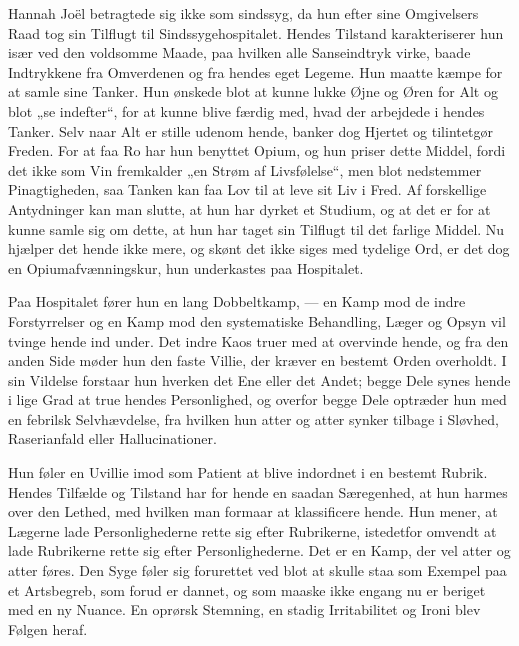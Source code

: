 \documentclass[12pt,a4paper,openany]{book}
\newcommand{\opage}[1]{\marginnote{\footnotesize\textit{[#1]}}}
\begin{document}
Hannah Joël betragtede sig ikke som sindssyg, da hun
efter sine Omgivelsers Raad tog sin Tilflugt til Sindssygehospitalet.
Hendes Tilstand karakteriserer hun især ved den voldsomme
Maade, paa hvilken alle Sanseindtryk virke, baade Indtrykkene
fra Omverdenen og fra hendes eget Legeme. Hun
maatte kæmpe for at samle sine Tanker. Hun ønskede blot at
kunne lukke Øjne og Øren for Alt og blot „se indefter“, for
at kunne blive færdig med, hvad der arbejdede i hendes Tanker.
Selv naar Alt er stille udenom hende, banker dog Hjertet og
tilintetgør Freden. For at faa Ro har hun benyttet Opium, og
hun priser dette Middel, fordi det ikke som Vin fremkalder „en
Strøm af Livsfølelse“, men blot nedstemmer Pinagtigheden, saa
Tanken kan faa Lov til at leve sit Liv i Fred. Af forskellige
Antydninger kan man slutte, at hun har dyrket et Studium, og
at det er for at kunne samle sig om dette, at hun har taget
sin Tilflugt til det farlige Middel. Nu hjælper det hende ikke
mere, og skønt det ikke siges med tydelige Ord, er det dog
en Opiumafvænningskur, hun underkastes paa Hospitalet.

Paa Hospitalet fører hun en lang Dobbeltkamp, --- en Kamp
mod de indre Forstyrrelser og en Kamp mod den systematiske
Behandling, Læger og Opsyn vil tvinge hende ind under. Det
indre Kaos truer med at overvinde hende, og fra den anden
Side møder hun den faste Villie, der kræver en bestemt Orden
overholdt. I sin Vildelse forstaar hun hverken det Ene eller
det Andet; begge Dele synes hende i lige Grad at true hendes
Personlighed, og overfor begge Dele optræder hun med en
\setcounter{footnote}{0}%
\opage{80}febrilsk Selvhævdelse, fra hvilken hun atter og atter synker tilbage
i Sløvhed, Raserianfald eller Hallucinationer.

Hun føler en Uvillie imod som Patient at blive indordnet
i en bestemt Rubrik. Hendes Tilfælde og Tilstand har for
hende en saadan Særegenhed, at hun harmes over den Lethed,
med hvilken man formaar at klassificere hende. Hun mener,
at Lægerne lade Personlighederne rette sig efter Rubrikerne,
istedetfor omvendt at lade Rubrikerne rette sig efter Personlighederne.
Det er en Kamp, der vel atter og atter føres. Den
Syge føler sig forurettet ved blot at skulle staa som Exempel
paa et Artsbegreb, som forud er dannet, og som maaske ikke
engang nu er beriget med en ny Nuance. En oprørsk Stemning,
en stadig Irritabilitet og Ironi blev Følgen heraf.
\end{document}
